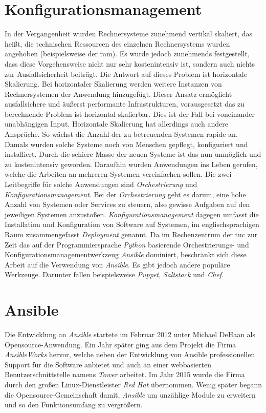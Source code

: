 \documentclass[titlepage]{report}
\begin{document}
\section*{Konfigurationsmanagement}
In der Vergangenheit wurden Rechnersysteme zunehmend vertikal skaliert,
das heißt, die technischen Ressourcen des einzelnen Rechnersystems wurden angehoben
(beispielsweise der \gls{ram}). Es wurde jedoch zunehmends
festgestellt, dass diese Vorgehensweise nicht nur sehr kostenintensiv
ist, sondern auch nichts zur Ausfallsicherheit beiträgt. Die
Antwort auf dieses Problem ist horizontale Skalierung. Bei horizontaler
Skalierung werden weitere Instanzen von Rechnersystemen der Anwendung
hinzugefügt. Dieser Ansatz ermöglicht ausfallsichere und äußerst performante
Infrastrukturen, vorausgesetzt das zu berechnende Problem ist horizontal
skalierbar. Dies ist der Fall bei voneinander unabhängigen Input. Horizontale
Skalierung hat allerdings auch andere Ansprüche. So wächst die Anzahl der zu
betreuenden Systemen rapide an.  Damals wurden solche Systeme noch von Menschen
gepflegt, konfiguriert und installiert. Durch die schiere Masse der neuen
Systeme ist das nun unmöglich und zu kostenintensiv geworden.  Daraufhin wurden
Anwendungen ins Leben gerufen, welche die Arbeiten an mehreren Systemen
vereinfachen sollen. Die zwei Leitbegriffe für solche Anwendungen sind
\emph{Orchestrierung} und \emph{Konfigurationsmanagement}. Bei der
\emph{Orchestrierung} geht es darum, eine hohe Anzahl von Systemen oder Services zu steuern,
also gewisse Aufgaben auf den jeweiligen Systemen anzustoßen.
\emph{Konfigurationsmanagement} dagegen umfasst die Installation und
Konfiguration von Software auf Systemen, im englischsprachigen Raum zusammengefasst
\emph{Deployment} genannt. Da im Rechenzentrum der \gls{tuc} zur Zeit das auf
der Programmiersprache \emph{Python} basierende Orchestrierungs\hyp{} und
Konfigurationsmanagementwerkzeug \emph{Ansible} dominiert, beschränkt sich diese
Arbeit auf die Verwendung von \emph{Ansible}. Es gibt jedoch andere populäre
Werkzeuge. Darunter fallen beispielsweise \emph{Puppet}, \emph{Saltstack} und
\emph{Chef}.
\section*{Ansible}
Die Entwicklung an \emph{Ansible} startete im Februar 2012 unter Michael
DeHaan als Opensource\hyp{}Anwendung\cite{ANSIBLE_ORIGINS}. Ein Jahr
später ging aus dem Projekt die Firma \emph{AnsibleWorks} hervor, welche
neben der Entwicklung von Ansible professionellen Support für die
Software anbietet und auch an einer webbasierten Benutzerschnittstelle
namens \emph{Tower} arbeitet\cite{ANSIBLEWORKS}. Im Jahr 2015 wurde die
Firma durch den großen Linux\hyp{}Dienstleister \emph{Red Hat}
übernommen\cite{ANSIBLEREDHAT}. Wenig später begann die
Opensource\hyp{}Gemeinschaft damit, \emph{Ansible} um unzählige Module zu
erweitern und so den Funktionsumfang zu vergrößern.
\end{document}

